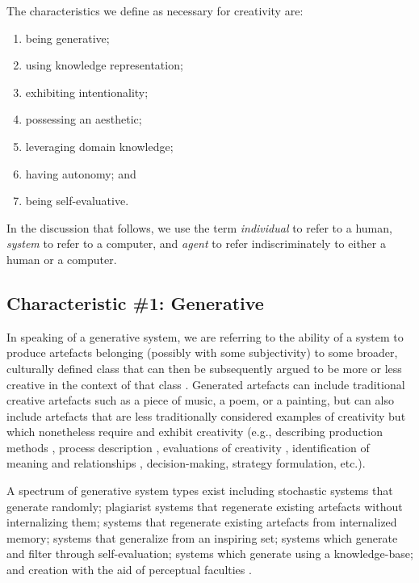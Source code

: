 \documentclass[phd,electronic,oneside,twosidetoc,letterpaper,chaptercenter,parttop,lof,lot]{byumsphd}
\begin{document}
The characteristics we define as necessary for creativity are:
\begin{enumerate}
\item being generative; 
\item using knowledge representation; 
\item exhibiting intentionality;
\item possessing an aesthetic;
\item leveraging domain knowledge; 
\item having autonomy; and
\item being self-evaluative. 
\end{enumerate}
\noindent In the discussion that follows, we use the term \textit{individual} to refer to a human, \textit{system} to refer to a computer, and \textit{agent} to refer indiscriminately to either a human or a computer.

\subsection{Characteristic \#1: Generative}

In speaking of a generative system, we are referring to the ability of a system to produce artefacts belonging (possibly with some subjectivity) to some broader, culturally defined class that can then be subsequently argued to be more or less creative in the context of that class \citep{Wiggins2006ASystems}. Generated artefacts can include traditional creative artefacts such as a piece of music, a poem, or a painting, but can also include artefacts that are less traditionally considered examples of creativity but which nonetheless require and exhibit creativity (e.g., describing production methods \citep{Ritchie2007}, process description \citep{colton2008creativity}, evaluations of creativity \citep{Colton2011}, identification of meaning and relationships \citep{norton2013finding}, decision-making, strategy formulation, etc.).

A spectrum of generative system types exist including stochastic systems that generate randomly; plagiarist systems that regenerate existing artefacts without internalizing them; systems that regenerate existing artefacts from internalized memory; systems that generalize from an inspiring set; systems which generate and filter through self-evaluation; systems which generate using a knowledge-base; and creation with the aid of perceptual faculties \citep{Ventura2016}.
\end{document}
